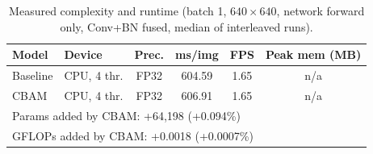 \begin{table}[!t]
\centering
\caption{Measured complexity and runtime (batch 1, $640\times640$, network forward only, Conv+BN fused, median of
interleaved runs).}
\label{tab:runtime}
\setlength{\tabcolsep}{3pt}
\begin{tabular}{llcccc}
\toprule
Model & Device & Prec. & ms/img & FPS & Peak mem (MB) \\
\midrule
Baseline & CPU, 4 thr. & FP32 & 604.59 & 1.65 & n/a \\
CBAM & CPU, 4 thr. & FP32 & 606.91 & 1.65 & n/a \\
\midrule
\multicolumn{6}{l}{Params added by CBAM: +64,198 (+0.094\%)} \\
\multicolumn{6}{l}{GFLOPs added by CBAM: +0.0018 (+0.0007\%)} \\
\bottomrule
\end{tabular}
\end{table}

